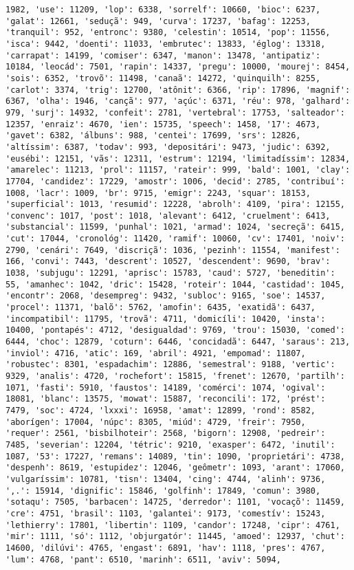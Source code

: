 \begin{Verbatim}[commandchars=\\\{\}]
1982, 'use': 11209, 'lop': 6338, 'sorrelf': 10660, 'bioc': 6237, 'galat': 12661, 'seduçã': 949, 'curva': 17237, 'bafag': 12253, 'tranquil': 952, 'entronc': 9380, 'celestin': 10514, 'pop': 11556, 'isca': 9442, 'doenti': 11033, 'embrutec': 13833, 'églog': 13318, 'carrapat': 14199, 'comiser': 6347, 'manon': 13478, 'antipatiz': 10184, 'leocád': 7501, 'rapin': 14337, 'pregu': 10000, 'mourej': 8454, 'sois': 6352, 'trovõ': 11498, 'canaã': 14272, 'quinquilh': 8255, 'carlot': 3374, 'trig': 12700, 'atônit': 6366, 'rip': 17896, 'magnif': 6367, 'olha': 1946, 'cançã': 977, 'açúc': 6371, 'réu': 978, 'galhard': 979, 'surj': 14932, 'confeit': 2781, 'vertebral': 17753, 'salteador': 12357, 'enraiz': 4670, 'ien': 15735, 'speech': 1458, '17': 4673, 'gavet': 6382, 'álbuns': 988, 'centei': 17699, 'srs': 12826, 'altíssim': 6387, 'todav': 993, 'depositári': 9473, 'judic': 6392, 'eusébi': 12151, 'vãs': 12311, 'estrum': 12194, 'limitadíssim': 12834, 'amarelec': 11213, 'prol': 11157, 'rateir': 999, 'bald': 1001, 'clay': 17704, 'candidez': 17229, 'amostr': 1006, 'decid': 2785, 'contribuí': 1008, 'lacr': 1009, 'br': 9715, 'emigr': 2243, 'squar': 18153, 'superficial': 1013, 'resumid': 12228, 'abrolh': 4109, 'pira': 12155, 'convenc': 1017, 'post': 1018, 'alevant': 6412, 'cruelment': 6413, 'substancial': 11599, 'punhal': 1021, 'armad': 1024, 'secreçã': 6415, 'cut': 17044, 'cronológ': 11420, 'ramif': 10060, 'cv': 17401, 'noiv': 2790, 'cenári': 7649, 'discriçã': 1036, 'pezinh': 11554, 'manifest': 166, 'convi': 7443, 'descrent': 10527, 'descendent': 9690, 'brav': 1038, 'subjugu': 12291, 'aprisc': 15783, 'caud': 5727, 'beneditin': 55, 'amanhec': 1042, 'dric': 15428, 'roteir': 1044, 'castidad': 1045, 'encontr': 2068, 'desempreg': 9432, 'subloc': 9165, 'soe': 14537, 'procel': 11371, 'balõ': 5762, 'amofin': 6435, 'exatidã': 6437, 'incompatibil': 11795, 'trovã': 4711, 'domicíli': 10420, 'insta': 10400, 'pontapés': 4712, 'desigualdad': 9769, 'trou': 15030, 'comed': 6444, 'choc': 12879, 'coturn': 6446, 'concidadã': 6447, 'saraus': 213, 'inviol': 4716, 'atic': 169, 'abril': 4921, 'empomad': 11807, 'robustec': 8301, 'espadachim': 12886, 'semestral': 9188, 'vertic': 9329, 'analis': 4720, 'rochefort': 15815, 'frenet': 12670, 'partilh': 1071, 'fasti': 5910, 'faustos': 14189, 'comérci': 1074, 'ogival': 18081, 'blanc': 13575, 'mowat': 15887, 'reconcili': 172, 'prést': 7479, 'soc': 4724, 'lxxxi': 16958, 'amat': 12899, 'rond': 8582, 'aborígen': 17004, 'núpc': 8305, 'miúd': 4729, 'freir': 7950, 'requer': 2561, 'bisbilhoteir': 2568, 'bigorn': 12908, 'pedreir': 7485, 'severian': 12204, 'tétric': 9210, 'exasper': 6472, 'inutil': 1087, '53': 17227, 'remans': 14089, 'tin': 1090, 'proprietári': 4738, 'despenh': 8619, 'estupidez': 12046, 'geômetr': 1093, 'arant': 17060, 'vulgaríssim': 10781, 'tisn': 13404, 'cing': 4744, 'alinh': 9736, ',.': 15914, 'dignific': 15846, 'golfinh': 17849, 'comun': 3980, 'sotaqu': 7505, 'barbacen': 14725, 'derredor': 1101, 'vocaçõ': 11459, 'cre': 4751, 'brasil': 1103, 'galantei': 9173, 'comestív': 15243, 'lethierry': 17801, 'libertin': 1109, 'candor': 17248, 'cipr': 4761, 'mir': 1111, 'só': 1112, 'objurgatór': 11445, 'amoed': 12937, 'chut': 14600, 'dilúvi': 4765, 'engast': 6891, 'hav': 1118, 'pres': 4767, 'lum': 4768, 'pant': 6510, 'marinh': 6511, 'aviv': 5094, 
\end{Verbatim}
